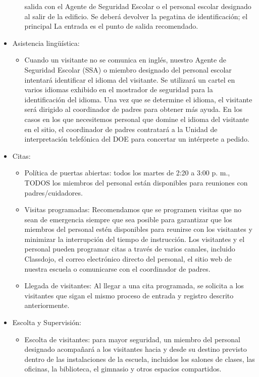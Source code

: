 \documentclass[12pt,letterpaper]{article}
\begin{document}
\begin{itemize}
\begin{itemize}
		salida con el Agente de Seguridad Escolar o el personal escolar 
		designado al salir de la edificio. Se deberá devolver la pegatina de 
		identificación; el principal La entrada es el punto de salida 
		recomendado.
		\end{itemize}
	\item Asistencia lingüística:
		\begin{itemize}
		\item Cuando un visitante no se comunica en inglés, nuestro Agente de Seguridad Escolar (SSA) o miembro designado del personal escolar intentará identificar el idioma del visitante. Se utilizará un cartel en varios idiomas exhibido en el mostrador de seguridad para la identificación del idioma. Una vez que se determine el idioma, el visitante será dirigido al coordinador de padres para obtener más ayuda. En los casos en los que necesitemos personal que domine el idioma del
\pagebreak
\vspace*{1.5cm}
visitante en el sitio, el coordinador de padres contratará a la Unidad de interpretación telefónica del DOE para concertar un intérprete a pedido.
		\end{itemize}
	\item Citas:
		\begin{itemize}
		\item Política de puertas abiertas: todos los martes de 2:20 a 3:00 p. m., TODOS los miembros del personal están disponibles para reuniones con padres/cuidadores.
		\item Visitas programadas: Recomendamos que se programen visitas que no sean de emergencia siempre que sea posible para garantizar que los miembros del personal estén disponibles para reunirse con los visitantes y minimizar la interrupción del tiempo de instrucción. Los visitantes y el personal pueden programar citas a través de varios canales, incluido Classdojo, el correo electrónico directo del personal, el sitio web de nuestra escuela o comunicarse con el coordinador de padres.
		\item Llegada de visitantes: Al llegar a una cita programada, se solicita a los visitantes que sigan el mismo proceso de entrada y registro descrito anteriormente.
		\end{itemize}
	\item Escolta y Supervisión:
		\begin{itemize}
		\item Escolta de visitantes: para mayor seguridad, un miembro del personal designado acompañará a los visitantes hacia y desde su destino previsto dentro de las instalaciones de la escuela, incluidos los salones de clases, las oficinas, la biblioteca, el gimnasio y otros espacios compartidos.

\end{itemize}
\end{itemize}
\end{document}
